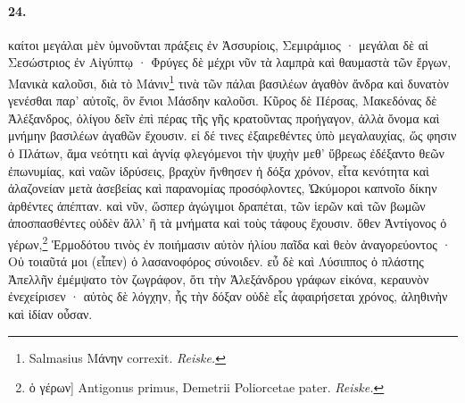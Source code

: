 \documentclass[a4paper, 11pt, oneside, polutonikogreek, german, landscape]{article}
\begin{document}
\paragraph{24.}
καίτοι μεγάλαι μὲν ὑμνοῦνται πράξεις ἐν Ἀσσυρίοις, Σεμιράμιος · μεγάλαι δὲ αἱ Σεσώστριος ἐν Αἰγύπτῳ · Φρύγες δὲ μέχρι νῦν τὰ λαμπρὰ καὶ θαυμαστὰ τῶν ἔργων, Μανικὰ καλοῦσι, διὰ τὸ Μάνιν\footnote{Salmasius Μάνην correxit. \emph{Reiske.}} τινὰ τῶν πάλαι βασιλέων ἀγαθὸν ἄνδρα καὶ δυνατὸν γενέσθαι παρ' αὐτοῖς, ὃν ἔνιοι Μάσδην καλοῦσι. Κῦρος δὲ Πέρσας, Μακεδόνας δὲ Ἀλέξανδρος, ὀλίγου δεῖν ἐπὶ πέρας τῆς γῆς κρατοῦντας προήγαγον, ἀλλὰ ὄνομα καὶ μνήμην βασιλέων ἀγαθῶν ἔχουσιν. εἰ δέ τινες ἐξαιρεθέντες ὑπὸ μεγαλαυχίας, ὥς φησιν ὁ Πλάτων, ἅμα νεότητι καὶ ἁγνίᾳ φλεγόμενοι τὴν ψυχὴν μεθ' ὕβρεως ἐδέξαντο θεῶν ἐπωνυμίας, καὶ ναῶν ἱδρύσεις, βραχὺν ἤνθησεν ἡ δόξα χρόνον, εἶτα κενότητα καὶ ἀλαζονείαν μετὰ ἀσεβείας καὶ παρανομίας προσόφλοντες, Ὠκύμοροι καπνοῖο δίκην ἀρθέντες ἀπέπταν. καὶ νῦν, ὥσπερ ἀγώγιμοι δραπέται, τῶν ἱερῶν καὶ τῶν βωμῶν ἀποσπασθέντες οὐδὲν ἄλλ' ἢ τὰ μνήματα καὶ τοὺς τάφους ἔχουσιν. ὅθεν Ἀντίγονος ὁ γέρων,\footnote{ὁ γέρων] Antigonus primus, Demetrii Poliorcetae pater. \emph{Reiske.}} Ἑρμοδότου τινὸς ἐν ποιήμασιν αὐτὸν ἡλίου παῖδα καὶ θεὸν ἀναγορεύοντος · Οὐ τοιαῦτά μοι (εἶπεν) ὁ λασανοφόρος σύνοιδεν. εὖ δὲ καὶ Λύσιππος ὁ πλάστης Ἀπελλῆν ἐμέμψατο τὸν ζωγράφον, ὅτι τὴν Ἀλεξάνδρου γράφων εἰκόνα, κεραυνὸν ἐνεχείρισεν · αὐτὸς δὲ λόγχην, ἧς τὴν δόξαν οὐδὲ εἷς ἀφαιρήσεται χρόνος, ἀληθινὴν καὶ ἰδίαν οὖσαν.
\end{document}
